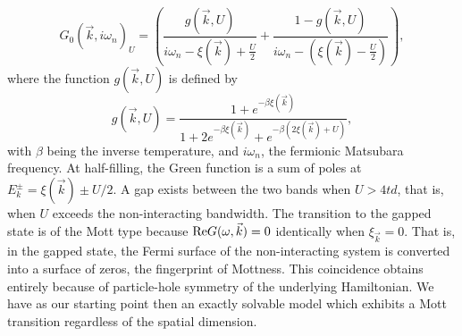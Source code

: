 \documentclass[prl,aps,twocolumn,groupaddress]{revtex4-1}
\begin{document}
\begin{equation}
G_0(\vec k,i\omega_n)_U = \left(\frac{g(\vec k, U)}{i \omega_n - \xi(\vec k)+\frac{U}{2}} +  \frac{1- g(\vec k, U)}{i\omega_n - \left(\xi(\vec k) - \frac{U}{2}\right)}\right),
\label{eq:GreensFunction}
\end{equation}
where the function $g(\vec k, U)$ is defined by
\begin{equation}
g(\vec k, U) = \frac{1+ e^{-\beta \xi(\vec k)}}{1+ 2 e^{-\beta \xi(\vec k)} + e^{-\beta\left(2\xi(\vec k) + U\right)}},
\end{equation}
with $\beta$ being the inverse temperature, and $i\omega_n$, the fermionic Matsubara frequency. At half-filling, the Green function is a sum of poles at $E^\pm_k=\xi(\vec k)\pm U/2$.  A gap exists between the two bands when $U> 4td$, that is, when $U$ exceeds the non-interacting bandwidth.  The transition to the gapped state is of the Mott type because ${\cal \Re }G(\omega,\vec k)=0$ identically when $\xi_{\vec k}=0$.  That is, in the gapped state, the Fermi surface of the non-interacting system is converted into a surface of zeros, the fingerprint\cite{stanescu2007} of Mottness. This coincidence obtains entirely because of particle-hole symmetry\cite{stanescu2007} of the underlying Hamiltonian.  We have as our starting point then an exactly solvable model which exhibits a Mott transition regardless of the spatial dimension.
\end{document}
